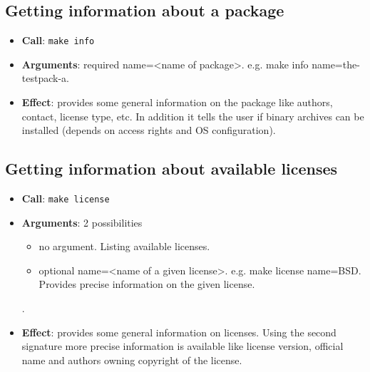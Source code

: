\documentclass[12pt,a4paper]{article}
\begin{document}
\subsection{Getting information about a package}
\begin{itemize}
\item \textbf{Call}: \texttt{make info}
\item \textbf{Arguments}: {required} name=<name of package>. e.g. make info name=the-testpack-a.
\item \textbf{Effect}: provides some general information on the package like authors, contact, license type, etc. In addition it tells the user if binary archives can be installed (depends on access rights and OS configuration).
\end{itemize}

\subsection{Getting information about available licenses}
\begin{itemize}
\item \textbf{Call}: \texttt{make license}
\item \textbf{Arguments}: 2 possibilities
\begin{itemize}
\item no argument. Listing available licenses.
\item {optional} name=<name of a given license>. e.g. make license name=BSD. Provides precise information on the given license.
\end{itemize}. 
\item \textbf{Effect}: provides some general information on licenses. Using the second signature more precise information is available like license version, official name and authors owning copyright of the license.
\end{itemize}
\end{document}
